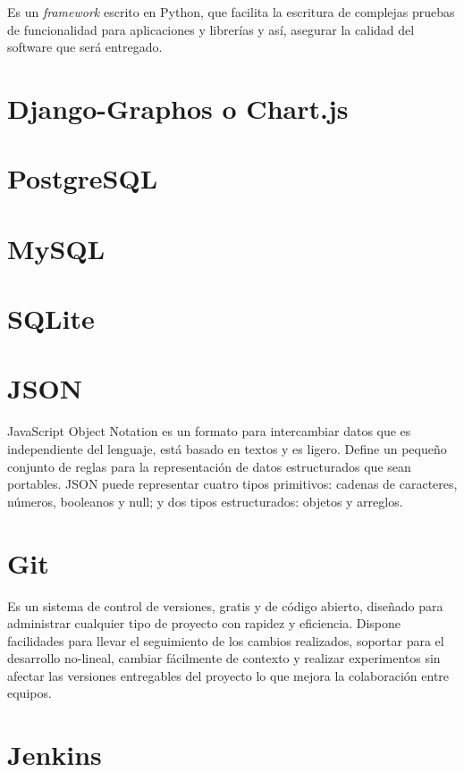 Es un \textit{framework} escrito en Python, que facilita la escritura de complejas pruebas de funcionalidad para aplicaciones y librerías y así, asegurar la calidad del software que será entregado. \citep{pytest}

\section{Django-Graphos o Chart.js}
\section{PostgreSQL}
\section{MySQL}
\section{SQLite}

\section{JSON}

JavaScript Object Notation es un formato para intercambiar datos que es independiente del lenguaje, está basado en textos y es ligero. Define un pequeño conjunto de reglas para la representación de datos estructurados que sean portables. JSON puede representar cuatro tipos primitivos: cadenas de caracteres, números, booleanos y null; y dos tipos estructurados: objetos y arreglos. \citep{JSON}

\section{Git}

Es un sistema de control de versiones, gratis y de código abierto, diseñado para administrar cualquier tipo de proyecto con rapidez y eficiencia. Dispone facilidades para llevar el seguimiento de los cambios realizados, soportar para el desarrollo no-lineal, cambiar fácilmente de contexto y realizar experimentos sin afectar las versiones entregables del proyecto lo que mejora la colaboración entre equipos. \citep{Git}

\section{Jenkins}


